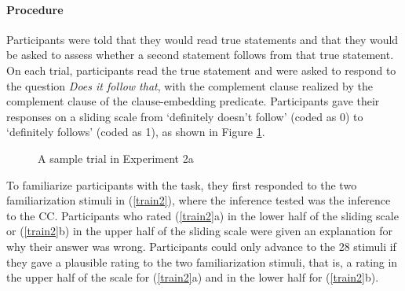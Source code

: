 \documentclass[11pt,fleqn]{article}
\newcommand{\6}{\mbox{$[\hspace*{-.6mm}[$}}
\newcommand{\9}{\mbox{$]\hspace*{-.6mm}]$}}
\begin{document}
\paragraph{Procedure} Participants were told that they would read true statements and that they would be asked to assess whether a second statement follows from that true statement. On each trial, participants read the true statement and were asked to respond to the question {\em Does it follow that}, with the complement clause realized by the complement clause of the clause-embedding predicate. Participants gave their responses on a sliding scale from `definitely doesn't follow' (coded as 0) to `definitely follows' (coded as 1), as shown in Figure \ref{f-trial-exp3}.

\begin{figure}[H]
\begin{center}
\end{center}
\caption{A sample trial in Experiment 2a}\label{f-trial-exp3}
\end{figure}

To familiarize participants with the task, they first responded to the two familiarization stimuli in (\ref{train2}), where the inference tested was the inference to the CC. Participants who rated (\ref{train2}a) in the lower half of the sliding scale or (\ref{train2}b) in the upper half of the sliding scale were given an explanation for why their answer was wrong. Participants could only advance to the 28 stimuli if they gave a plausible rating to the two familiarization stimuli, that is, a rating in the upper half of the scale for (\ref{train2}a) and in the lower half for (\ref{train2}b).
\end{document}
